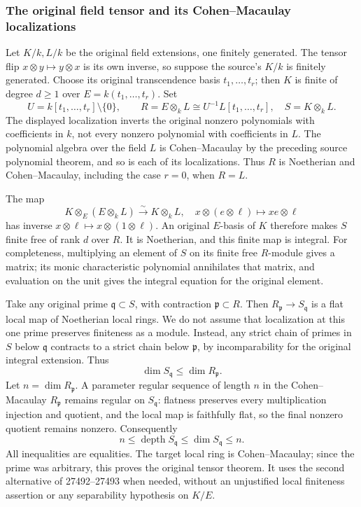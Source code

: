 \subsubsection{The original field tensor and its Cohen--Macaulay localizations}\label{algebra-proof-071-the-original-field-tensor-and-its-cohenmacaulay-localizations}

Let \(K/k,L/k\) be the original field extensions, one finitely generated. The tensor flip \(x\otimes y\mapsto y\otimes x\) is its own inverse, so suppose the source's \(K/k\) is finitely generated. Choose its original transcendence basis \(t_1,\ldots,t_r\); then \(K\) is finite of degree \(d\ge1\) over \(E=k(t_1,\ldots,t_r)\). Set \[
 U=k[t_1,\ldots,t_r]\setminus\{0\},\qquad
 R=E\otimes_kL\cong U^{-1}L[t_1,\ldots,t_r],
 \quad S=K\otimes_kL.
\] The displayed localization inverts the original nonzero polynomials with coefficients in \(k\), not every nonzero polynomial with coefficients in \(L\). The polynomial algebra over the field \(L\) is Cohen--Macaulay by the preceding source polynomial theorem, and so is each of its localizations. Thus \(R\) is Noetherian and Cohen--Macaulay, including the case \(r=0\), when \(R=L\).

The map \[
 K\otimes_E(E\otimes_kL)\xrightarrow{\sim}K\otimes_kL,
 \quad x\otimes(e\otimes\ell)\longmapsto xe\otimes\ell
\] has inverse \(x\otimes\ell\mapsto x\otimes(1\otimes\ell)\). An original \(E\)-basis of \(K\) therefore makes \(S\) finite free of rank \(d\) over \(R\). It is Noetherian, and this finite map is integral. For completeness, multiplying an element of \(S\) on its finite free \(R\)-module gives a matrix; its monic characteristic polynomial annihilates that matrix, and evaluation on the unit gives the integral equation for the original element.

Take any original prime \(\mathfrak q\subset S\), with contraction \(\mathfrak p\subset R\). Then \(R_{\mathfrak p}\to S_{\mathfrak q}\) is a flat local map of Noetherian local rings. We do not assume that localization at this one prime preserves finiteness as a module. Instead, any strict chain of primes in \(S\) below \(\mathfrak q\) contracts to a strict chain below \(\mathfrak p\), by incomparability for the original integral extension. Thus \[
 \dim S_{\mathfrak q}\le\dim R_{\mathfrak p}.
\] Let \(n=\dim R_{\mathfrak p}\). A parameter regular sequence of length \(n\) in the Cohen--Macaulay \(R_{\mathfrak p}\) remains regular on \(S_{\mathfrak q}\): flatness preserves every multiplication injection and quotient, and the local map is faithfully flat, so the final nonzero quotient remains nonzero. Consequently \[
 n\le\operatorname{depth}S_{\mathfrak q}
   \le\dim S_{\mathfrak q}\le n.
\] All inequalities are equalities. The target local ring is Cohen--Macaulay; since the prime was arbitrary, this proves the original tensor theorem. It uses the second alternative of 27492--27493 when needed, without an unjustified local finiteness assertion or any separability hypothesis on \(K/E\).

